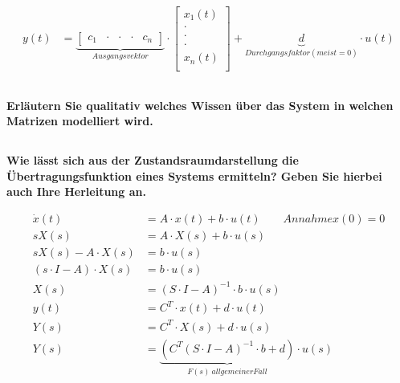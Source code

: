 \begin{equation}
\begin{aligned}
        y(t)    & =\underbrace{\left[\begin{array}{ccccc}
                    c_1 & \cdot & \cdot & \cdot & c_n
                \end{array}\right]}_{Ausgangsvektor}\cdot\left[
            \begin{array}{c}
                x_1(t) \\
                \cdot  \\
                \cdot  \\
                \cdot  \\
                x_n(t) \\
            \end{array}
            \right]+\underbrace{d}_{Durchgangsfaktor(meist=0)}\cdot u(t)
    \end{aligned}
\end{equation}

\subsection{}
\textbf{Erläutern Sie qualitativ welches Wissen über das System in welchen Matrizen modelliert wird.}

\subsection{}
\textbf{Wie lässt sich aus der Zustandsraumdarstellung die Übertragungsfunktion eines Systems ermitteln? Geben Sie hierbei auch Ihre Herleitung an.}

\begin{equation}
    \begin{aligned}
        \dot{x}(t)             & =A\cdot x(t)+b\cdot u(t)\qquad Annahme x(0)=0                                    \\
        sX(s)                  & =A\cdot X(s)+b\cdot u(s)                                                         \\
        sX(s)-A\cdot X(s)      & =b\cdot u(s)                                                                     \\
        (s\cdot I-A)\cdot X(s) & =b\cdot u(s)                                                                     \\
        X(s)                   & =(S\cdot I-A)^{-1}\cdot b\cdot u(s)                                              \\
        y(t)                   & =C^T\cdot x(t)+d\cdot u(t)                                                       \\
        Y(s)                   & =C^T\cdot X(s)+d\cdot u(s)                                                       \\
        Y(s)                   & =\underbrace{(C^T(S\cdot I-A)^{-1}\cdot b+d)}_{F(s)\ allgemeiner Fall}\cdot u(s)
    \end{aligned}
\end{equation}
